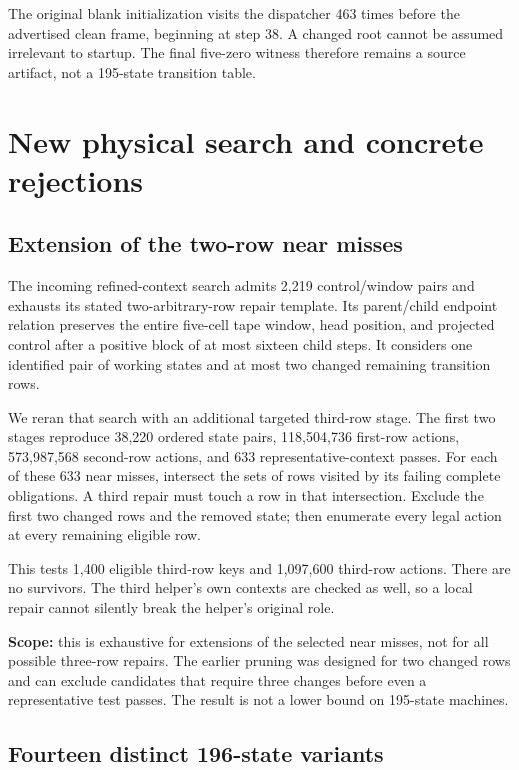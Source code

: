 \documentclass[11pt,letterpaper]{article}
\begin{document}
The original blank initialization visits the dispatcher 463 times before
the advertised clean frame, beginning at step 38. A changed root cannot be
assumed irrelevant to startup. The final five-zero witness therefore remains
a source artifact, not a 195-state transition table.



\section{New physical search and concrete rejections}

\subsection{Extension of the two-row near misses}

The incoming refined-context search admits 2,219 control/window pairs and
exhausts its stated two-arbitrary-row repair template. Its parent/child
endpoint relation preserves the entire five-cell tape window, head position,
and projected control after a positive block of at most sixteen child steps.
It considers one identified pair of working states and at most two changed
remaining transition rows.

We reran that search with an additional targeted third-row stage. The
first two stages reproduce 38,220 ordered state pairs, 118,504,736 first-row
actions, 573,987,568 second-row actions, and 633 representative-context
passes. For each of these 633 near misses, intersect the sets of rows visited
by its failing complete obligations. A third repair must touch a row in
that intersection. Exclude the first two changed rows and the removed state;
then enumerate every legal action at every remaining eligible row.

This tests 1,400 eligible third-row keys and 1,097,600 third-row actions.
There are no survivors. The third helper's own contexts are checked as well,
so a local repair cannot silently break the helper's original role.

\textbf{Scope:} this is exhaustive for extensions of the selected near misses,
not for all possible three-row repairs. The earlier pruning was designed for
two changed rows and can exclude candidates that require three changes
before even a representative test passes. The result is not a lower bound
on 195-state machines.

\subsection{Fourteen distinct 196-state variants}
\end{document}
